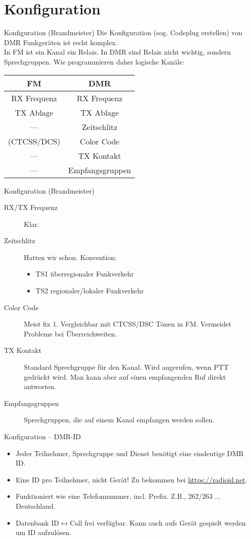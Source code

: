 \documentclass[aspectratio=169]{beamer}
\begin{document}
\section{Konfiguration}
\begin{frame}{Konfiguration (Brandmeister)}
Die Konfiguration (sog. Codeplug erstellen) von DMR Funkgeräten ist recht komplex. \\[0.5cm]

In FM ist ein Kanal ein Relais. In DMR sind Relais nicht wichtig, sondern Sprechgruppen. Wie programmieren daher logische Kanäle:
\begin{center}
\begin{tabular}{|c|c|} \hline
FM & DMR \\ \hline \hline
RX Frequenz & RX Frequenz \\
TX Ablage & TX Ablage \\
 --- & Zeitschlitz \\
(CTCSS/DCS) & Color Code \\
--- & TX Kontakt \\
--- & Empfangsgruppen \\\hline
\end{tabular}
\end{center}
\end{frame}

\begin{frame}{Konfiguration (Brandmeister)}
\begin{description}
 \item[RX/TX Frequenz] Klar.
 \item[Zeitschlitz] Hatten wir schon. Konvention: 
 \begin{itemize}
  \item TS1 überregionaler Funkverkehr
  \item TS2 regionaler/lokaler Funkverkehr
 \end{itemize}
 \item[Color Code] Meist fix 1. Vergleichbar mit CTCSS/DSC Tönen in FM. Vermeidet Probleme bei Überreichweiten.
 \item[TX Kontakt] Standard Sprechgruppe für den Kanal. Wird angerufen, wenn PTT gedrückt wird. Man kann aber auf einen empfangenden Ruf direkt antworten. 
 \item[Empfangsgruppen] Sprechgruppen, die auf einem Kanal empfangen werden sollen.
\end{description}
\end{frame}

\begin{frame}{Konfiguration -- DMR-ID}
 \begin{itemize}
  \item Jeder Teilnehmer, Sprechgruppe und Dienst benötigt eine eindeutige DMR ID. 
  \item Eine ID pro Teilnehmer, nicht Gerät! Zu bekommen bei \url{https://radioid.net}.
  \item Funktioniert wie eine Telefonnummer, incl. Prefix. Z.B., 262/263 ... Deutschland.
  \item Datenbank ID$\leftrightarrow$Call frei verfügbar. Kann auch aufs Gerät gespielt werden um ID aufzulösen.
 \end{itemize}
\end{frame}
\end{document}
